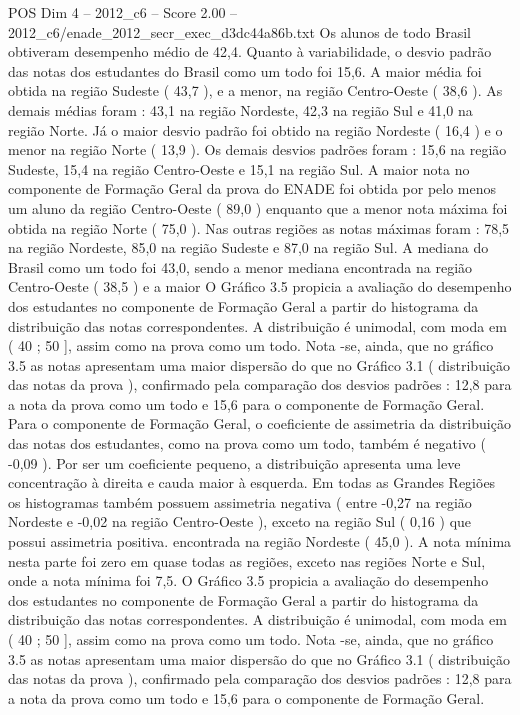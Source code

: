 \begin{textsample}{POS Dim 4 – 2012\_c6 – Score 2.00 – 2012\_c6/enade\_2012\_secr\_exec\_d3dc44a86b.txt}
Os alunos de todo Brasil obtiveram desempenho médio de 42,4.
Quanto à variabilidade, o desvio padrão das notas dos estudantes do Brasil como um todo foi 15,6.
A maior média foi obtida na região Sudeste ( 43,7 ), e a menor, na região Centro-Oeste ( 38,6 ).
As demais médias foram : 43,1 na região Nordeste, 42,3 na região Sul e 41,0 na região Norte.
Já o maior desvio padrão foi obtido na região Nordeste ( 16,4 ) e o menor na região Norte ( 13,9 ).
Os demais desvios padrões foram : 15,6 na região Sudeste, 15,4 na região Centro-Oeste e 15,1 na região Sul.
A maior nota no componente de Formação Geral da prova do ENADE foi obtida por pelo menos um aluno da região Centro-Oeste ( 89,0 ) enquanto que a menor nota máxima foi obtida na região Norte ( 75,0 ).
Nas outras regiões as notas máximas foram : 78,5 na região Nordeste, 85,0 na região Sudeste e 87,0 na região Sul.
A mediana do Brasil como um todo foi 43,0, sendo a menor mediana encontrada na região Centro-Oeste ( 38,5 ) e a maior O Gráfico 3.5 propicia a avaliação do desempenho dos estudantes no componente de Formação Geral a partir do histograma da distribuição das notas correspondentes.
A distribuição é unimodal, com moda em ( 40 ; 50 ], assim como na prova como um todo.
Nota -se, ainda, que no gráfico 3.5 as notas apresentam uma maior dispersão do que no Gráfico 3.1 ( distribuição das notas da prova ), confirmado pela comparação dos desvios padrões : 12,8 para a nota da prova como um todo e 15,6 para o componente de Formação Geral.
Para o componente de Formação Geral, o coeficiente de assimetria da distribuição das notas dos estudantes, como na prova como um todo, também é negativo ( -0,09 ).
Por ser um coeficiente pequeno, a distribuição apresenta uma leve concentração à direita e cauda maior à esquerda.
Em todas as Grandes Regiões os histogramas também possuem assimetria negativa ( entre -0,27 na região Nordeste e -0,02 na região Centro-Oeste ), exceto na região Sul ( 0,16 ) que possui assimetria positiva. encontrada na região Nordeste ( 45,0 ).
A nota mínima nesta parte foi zero em quase todas as regiões, exceto nas regiões Norte e Sul, onde a nota mínima foi 7,5.
O Gráfico 3.5 propicia a avaliação do desempenho dos estudantes no componente de Formação Geral a partir do histograma da distribuição das notas correspondentes.
A distribuição é unimodal, com moda em ( 40 ; 50 ], assim como na prova como um todo.
Nota -se, ainda, que no gráfico 3.5 as notas apresentam uma maior dispersão do que no Gráfico 3.1 ( distribuição das notas da prova ), confirmado pela comparação dos desvios padrões : 12,8 para a nota da prova como um todo e 15,6 para o componente de Formação Geral.

\end{textsample}
